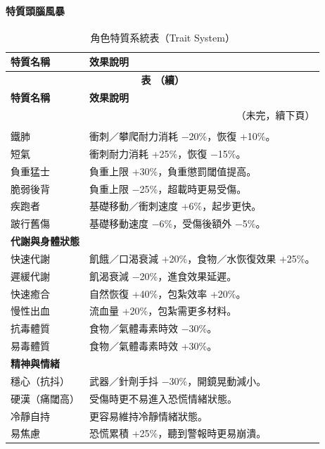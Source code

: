 \paragraph{\Large\bfseries 特質頭腦風暴}
\begin{longtable}{p{3cm}p{12cm}}
\caption{角色特質系統表（Trait System）} \label{tab:traits} \\
\toprule
\textbf{特質名稱} & \textbf{效果說明} \\
\midrule
\endfirsthead

\multicolumn{2}{c}{{\bfseries 表 \thetable{}（續）}} \\
\toprule
\textbf{特質名稱} & \textbf{效果說明} \\
\midrule
\endhead

\bottomrule
\multicolumn{2}{r}{（未完，續下頁）} \\
\endfoot

\bottomrule
\endlastfoot

\multicolumn{2}{l}{\textbf{體能相關}} \\[3pt]
鐵肺 & 衝刺／攀爬耐力消耗 −20\%，恢復 +10\%。 \\
短氣 & 衝刺耐力消耗 +25\%，恢復 −15\%。 \\
負重猛士 & 負重上限 +30\%，負重懲罰閾值提高。 \\
脆弱後背 & 負重上限 −25\%，超載時更易受傷。 \\
疾跑者 & 基礎移動／衝刺速度 +6\%，起步更快。 \\
跛行舊傷 & 基礎移動速度 −6\%，受傷後額外 −5\%。 \\[5pt]

\multicolumn{2}{l}{\textbf{代謝與身體狀態}} \\[3pt]
快速代謝 & 飢餓／口渴衰減 +20\%，食物／水恢復效果 +25\%。 \\
遲緩代謝 & 飢渴衰減 −20\%，進食效果延遲。 \\
快速癒合 & 自然恢復 +40\%，包紮效率 +20\%。 \\
慢性出血 & 流血量 +20\%，包紮需更多材料。 \\
抗毒體質 & 食物／氣體毒素時效 −30\%。 \\
易毒體質 & 食物／氣體毒素時效 +30\%。 \\[5pt]

\multicolumn{2}{l}{\textbf{精神與情緒}} \\[3pt]
穩心（抗抖） & 武器／針劑手抖 −30\%，開鏡晃動減小。 \\
硬漢（痛閾高） & 受傷時更不易進入恐慌情緒狀態。 \\
冷靜自持 & 更容易維持冷靜情緒狀態。 \\
易焦慮 & 恐慌累積 +25\%，聽到警報時更易崩潰。 \\[5pt]


\end{longtable}
